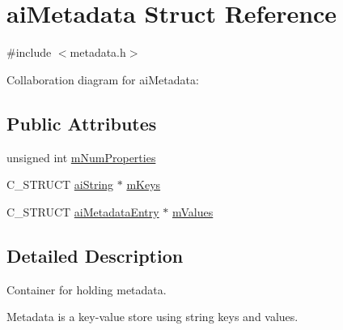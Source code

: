 \hypertarget{structai_metadata}{\section{ai\-Metadata Struct Reference}
\label{structai_metadata}
}


{\ttfamily \#include $<$metadata.\-h$>$}



Collaboration diagram for ai\-Metadata\-:
\subsection*{Public Attributes}
\begin{DoxyCompactItemize}
\item 
unsigned int \hyperlink{structai_metadata_a32c4587c53dd402a5878ffc94088e528}{m\-Num\-Properties}
\item 
C\-\_\-\-S\-T\-R\-U\-C\-T \hyperlink{structai_string}{ai\-String} $\ast$ \hyperlink{structai_metadata_aa8c77a263443658737ee51a74e3c292e}{m\-Keys}
\item 
C\-\_\-\-S\-T\-R\-U\-C\-T \hyperlink{structai_metadata_entry}{ai\-Metadata\-Entry} $\ast$ \hyperlink{structai_metadata_a34b515fcb5b806c471d3c6ce7bc76beb}{m\-Values}
\end{DoxyCompactItemize}


\subsection{Detailed Description}
Container for holding metadata.

Metadata is a key-\/value store using string keys and values. 

